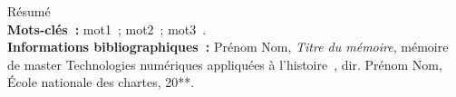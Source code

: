 \medskip	

Résumé\\

\textbf{Mots-clés~:} mot1~; mot2~; mot3~.\\

\textbf{Informations bibliographiques~:} Prénom Nom, \textit{Titre du mémoire}, mémoire de master \og Technologies numériques appliquées à l'histoire~\fg, dir. Prénom Nom, École nationale des chartes, 20**.

\clearemptydoublepage